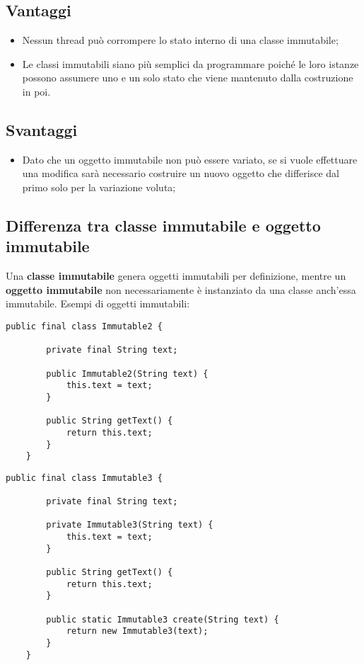 \subsection{Vantaggi}
\begin{itemize}
	\item Nessun thread può corrompere lo stato interno di una classe immutabile;
	\item  Le classi immutabili siano più semplici da programmare poiché le loro istanze possono assumere uno e un solo stato che viene mantenuto dalla costruzione in poi. 
\end{itemize}

\subsection{Svantaggi}
\begin{itemize}
	\item Dato che un oggetto immutabile non può essere variato, se si vuole effettuare una modifica sarà necessario costruire un nuovo oggetto che differisce dal primo solo per la variazione voluta;
\end{itemize}

\subsection{Differenza tra classe immutabile e oggetto immutabile}
Una \textbf{classe immutabile} genera oggetti immutabili per definizione, mentre un \textbf{oggetto immutabile} non necessariamente è instanziato da una classe anch’essa immutabile.
Esempi di oggetti immutabili:
\begin{lstlisting}
public final class Immutable2 {
    
        private final String text;
    
        public Immutable2(String text) {
            this.text = text;
        }
    
        public String getText() {
            return this.text;
        }
    }	
\end{lstlisting}

\begin{lstlisting}
public final class Immutable3 {
    
        private final String text;
    
        private Immutable3(String text) {
            this.text = text;
        }
    
        public String getText() {
            return this.text;
        }
    
        public static Immutable3 create(String text) {
            return new Immutable3(text);
        }
    }	
\end{lstlisting}

